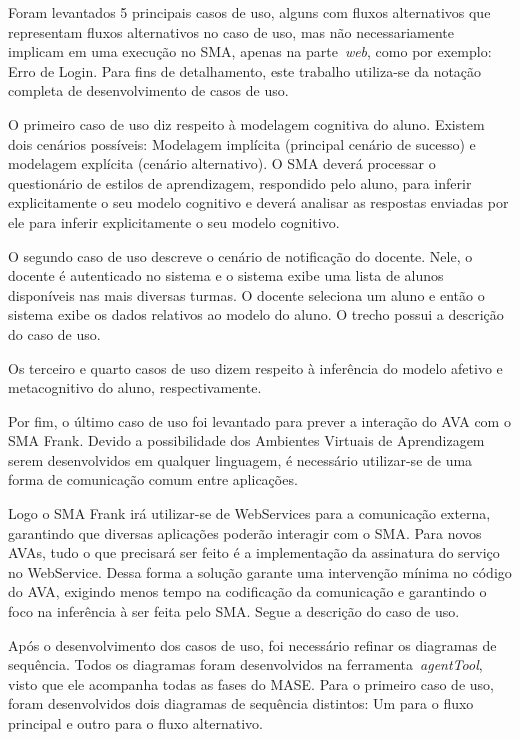 Foram levantados 5 principais casos de uso, alguns com fluxos alternativos que representam fluxos alternativos no caso de uso, mas não necessariamente implicam em uma execução no SMA, apenas na parte~\emph{web}, como por exemplo: Erro de Login. Para fins de detalhamento, este trabalho utiliza-se da notação completa de desenvolvimento de casos de uso.

O primeiro caso de uso diz respeito à modelagem cognitiva do aluno. Existem dois cenários possíveis: Modelagem implícita (principal cenário de sucesso) e modelagem explícita (cenário alternativo). O SMA deverá processar o questionário de estilos de aprendizagem, respondido pelo aluno, para inferir explicitamente o seu modelo cognitivo e deverá analisar as respostas enviadas por ele para inferir explicitamente o seu modelo cognitivo.

O segundo caso de uso descreve o cenário de notificação do docente. Nele, o docente é autenticado no sistema e o sistema exibe uma lista de alunos disponíveis nas mais diversas turmas. O docente seleciona um aluno e então o sistema exibe os dados relativos ao modelo do aluno. O trecho possui a descrição do caso de uso.

Os terceiro e quarto casos de uso dizem respeito à inferência do modelo afetivo e metacognitivo do aluno, respectivamente.

Por fim, o último caso de uso foi levantado para prever a interação do AVA com o SMA Frank. Devido a possibilidade dos Ambientes Virtuais de Aprendizagem serem desenvolvidos em qualquer linguagem, é necessário utilizar-se de uma forma de comunicação comum entre aplicações.

Logo o SMA Frank irá utilizar-se de WebServices para a comunicação externa, garantindo que diversas aplicações poderão interagir com o SMA. Para novos AVAs, tudo o que precisará ser feito é a implementação da assinatura do serviço no WebService. Dessa forma a solução garante uma intervenção mínima no código do AVA, exigindo menos tempo na codificação da comunicação e garantindo o foco na inferência à ser feita pelo SMA. Segue a descrição do caso de uso.

Após o desenvolvimento dos casos de uso, foi necessário refinar os diagramas de sequência. Todos os diagramas foram desenvolvidos na ferramenta~\emph{agentTool}, visto que ele acompanha todas as fases do MASE. Para o primeiro caso de uso, foram desenvolvidos dois diagramas de sequência distintos: Um para o fluxo principal e outro para o fluxo alternativo.

